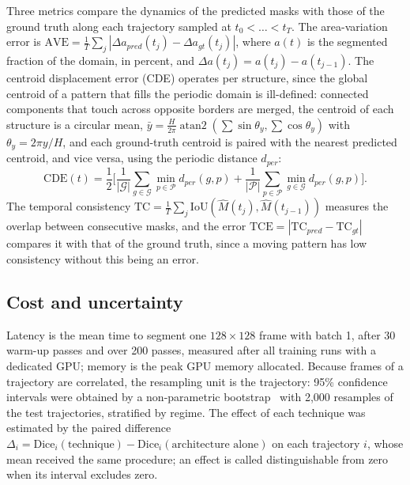 \documentclass[final,5p,times,twocolumn]{elsarticle}
\begin{document}
Three metrics compare the dynamics of the predicted masks with those of the ground truth along each trajectory sampled at $t_0<\dots<t_T$. The area-variation error is $\mathrm{AVE}=\frac{1}{T}\sum_j|\Delta a_{pred}(t_j)-\Delta a_{gt}(t_j)|$, where $a(t)$ is the segmented fraction of the domain, in percent, and $\Delta a(t_j)=a(t_j)-a(t_{j-1})$. The centroid displacement error (CDE) operates per structure, since the global centroid of a pattern that fills the periodic domain is ill-defined: connected components that touch across opposite borders are merged, the centroid of each structure is a circular mean, $\bar y=\frac{H}{2\pi}\operatorname{atan2}(\sum\sin\theta_y,\sum\cos\theta_y)$ with $\theta_y=2\pi y/H$, and each ground-truth centroid is paired with the nearest predicted centroid, and vice versa, using the periodic distance $d_{per}$:
\begin{equation}\label{eq:cde}
\mathrm{CDE}(t)=\frac12\Big[\frac{1}{|\mathcal{G}|}\sum_{g\in\mathcal{G}}\min_{p\in\mathcal{P}}d_{per}(g,p)+\frac{1}{|\mathcal{P}|}\sum_{p\in\mathcal{P}}\min_{g\in\mathcal{G}}d_{per}(g,p)\Big].
\end{equation}
The temporal consistency $\mathrm{TC}=\frac{1}{T}\sum_j\mathrm{IoU}(\hat M(t_j),\hat M(t_{j-1}))$ measures the overlap between consecutive masks, and the error $\mathrm{TCE}=|\mathrm{TC}_{pred}-\mathrm{TC}_{gt}|$ compares it with that of the ground truth, since a moving pattern has low consistency without this being an error.

\subsection{Cost and uncertainty}\label{subsec:cost}

Latency is the mean time to segment one $128\times128$ frame with batch 1, after 30 warm-up passes and over 200 passes, measured after all training runs with a dedicated GPU; memory is the peak GPU memory allocated. Because frames of a trajectory are correlated, the resampling unit is the trajectory: 95\% confidence intervals were obtained by a non-parametric bootstrap~\cite{efron1993} with 2,000 resamples of the test trajectories, stratified by regime. The effect of each technique was estimated by the paired difference $\Delta_i=\mathrm{Dice}_i(\text{technique})-\mathrm{Dice}_i(\text{architecture alone})$ on each trajectory $i$, whose mean received the same procedure; an effect is called distinguishable from zero when its interval excludes zero.

\end{document}

